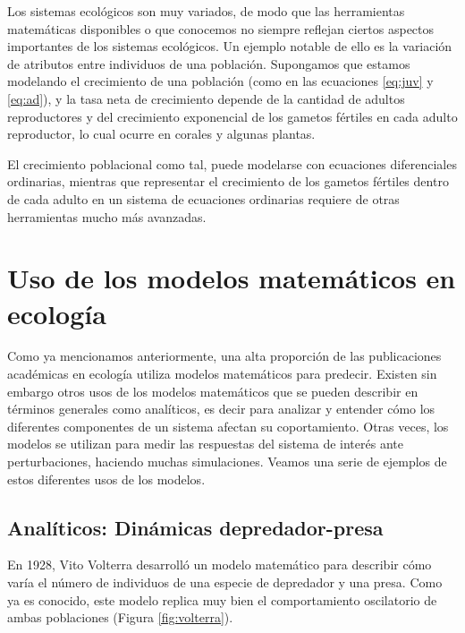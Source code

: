 \documentclass[
]{book}
\begin{document}
Los sistemas ecológicos son muy variados, de modo que las herramientas matemáticas disponibles o que conocemos no siempre reflejan ciertos aspectos importantes de los sistemas ecológicos. Un ejemplo notable de ello es la variación de atributos entre individuos de una población. Supongamos que estamos modelando el crecimiento de una población (como en las ecuaciones \eqref{eq:juv} y \eqref{eq:ad}), y la tasa neta de crecimiento depende de la cantidad de adultos reproductores y del crecimiento exponencial de los gametos fértiles en cada adulto reproductor, lo cual ocurre en corales y algunas plantas.

El crecimiento poblacional como tal, puede modelarse con ecuaciones diferenciales ordinarias, mientras que representar el crecimiento de los gametos fértiles dentro de cada adulto en un sistema de ecuaciones ordinarias requiere de otras herramientas mucho más avanzadas.

\hypertarget{uso-de-los-modelos-matemuxe1ticos-en-ecologuxeda}{%
\section{Uso de los modelos matemáticos en ecología}\label{uso-de-los-modelos-matemuxe1ticos-en-ecologuxeda}}

Como ya mencionamos anteriormente, una alta proporción de las publicaciones académicas en ecología utiliza modelos matemáticos para predecir. Existen sin embargo otros usos de los modelos matemáticos que se pueden describir en términos generales como analíticos, es decir para analizar y entender cómo los diferentes componentes de un sistema afectan su coportamiento. Otras veces, los modelos se utilizan para medir las respuestas del sistema de interés ante perturbaciones, haciendo muchas simulaciones. Veamos una serie de ejemplos de estos diferentes usos de los modelos.

\hypertarget{analuxedticos-dinuxe1micas-depredador-presa}{%
\subsection{Analíticos: Dinámicas depredador-presa}\label{analuxedticos-dinuxe1micas-depredador-presa}}

En 1928, Vito Volterra \citep{volterra1928variations} desarrolló un modelo matemático para describir cómo varía el número de individuos de una especie de depredador y una presa. Como ya es conocido, este modelo replica muy bien el comportamiento oscilatorio de ambas poblaciones (Figura \ref{fig:volterra}).
\end{document}
